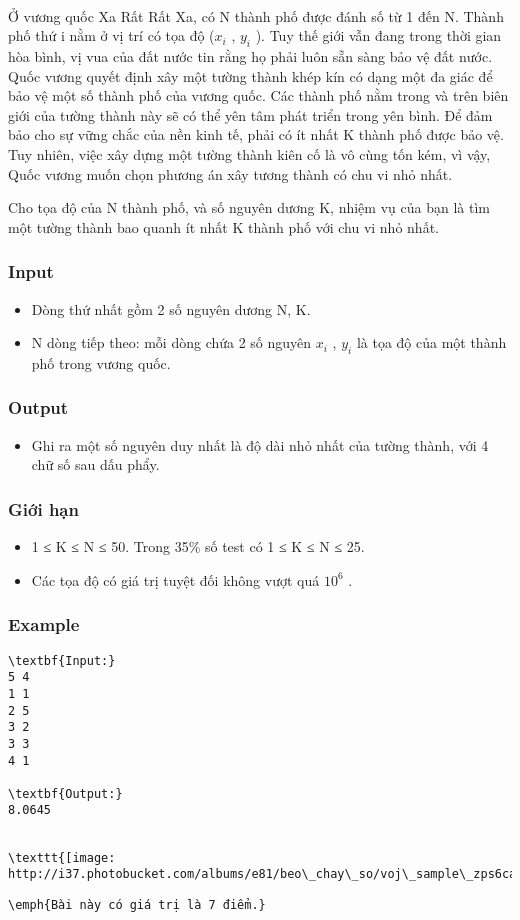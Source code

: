 

 

Ở vương quốc Xa Rất Rất Xa, có N thành phố được đánh số từ 1 đến N. Thành phố thứ i nằm ở vị trí có tọa độ ($x_{i}$ , $y_{i}$ ). Tuy thế giới vẫn đang trong thời gian hòa bình, vị vua của đất nước tin rằng họ phải luôn sẵn sàng bảo vệ đất nước. Quốc vương quyết định xây một tường thành khép kín có dạng một đa giác để bảo vệ một số thành phố của vương quốc. Các thành phố nằm trong và trên biên giới của tường thành này sẽ có thể yên tâm phát triển trong yên bình. Để đảm bảo cho sự vững chắc của nền kinh tế, phải có ít nhất K thành phố được bảo vệ. Tuy nhiên, việc xây dựng một tường thành kiên cố là vô cùng tốn kém, vì vậy, Quốc vương muốn chọn phương án xây tương thành có chu vi nhỏ nhất.

Cho tọa độ của N thành phố, và số nguyên dương K, nhiệm vụ của bạn là tìm một tường thành bao quanh ít nhất K thành phố với chu vi nhỏ nhất.

\subsubsection{Input}
\begin{itemize}
	\item Dòng thứ nhất gồm 2 số nguyên dương N, K.
	\item N dòng tiếp theo: mỗi dòng chứa 2 số nguyên $x_{i}$ , $y_{i}$ là tọa độ của một thành phố trong vương quốc.
\end{itemize}

\subsubsection{Output}
\begin{itemize}
	\item Ghi ra một số nguyên duy nhất là độ dài nhỏ nhất của tường thành, với 4 chữ số sau dấu phẩy.
\end{itemize}

\subsubsection{Giới hạn}
\begin{itemize}
	\item 1 ≤ K ≤ N ≤ 50. Trong 35\% số test có 1 ≤ K ≤ N ≤ 25.
	\item Các tọa độ có giá trị tuyệt đối không vượt quá $10^{6}$ .
\end{itemize}

\subsubsection{Example}
\begin{verbatim}
\textbf{Input:}
5 4
1 1
2 5
3 2
3 3
4 1

\textbf{Output:}
8.0645
\end{verbatim}
\begin{verbatim}

\texttt{[image: http://i37.photobucket.com/albums/e81/beo\_chay\_so/voj\_sample\_zps6cadef14.png]}\end{verbatim}
\begin{verbatim}
\emph{Bài này có giá trị là 7 điểm.}\end{verbatim}
